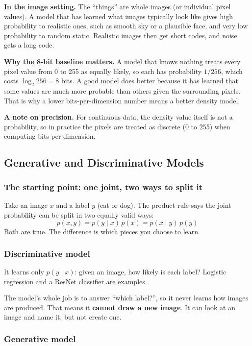 \textbf{In the image setting.} The ``things'' are whole images (or individual pixel values). A model that has learned what images typically look like gives high probability to realistic ones, such as smooth sky or a plausible face, and very low probability to random static. Realistic images then get short codes, and noise gets a long code.

\textbf{Why the 8-bit baseline matters.} A model that knows nothing treats every pixel value from 0 to 255 as equally likely, so each has probability $1/256$, which costs $\log_2 256 = 8$ bits. A good model does better because it has learned that some values are much more probable than others given the surrounding pixels. That is why a lower bits-per-dimension number means a better density model.

\textbf{A note on precision.} For continuous data, the density value itself is not a probability, so in practice the pixels are treated as discrete (0 to 255) when computing bits per dimension.

\subsection*{Generative and Discriminative Models}

\subsubsection*{The starting point: one joint, two ways to split it}

Take an image $x$ and a label $y$ (cat or dog). The product rule says the joint probability can be split in two equally valid ways:
\[
p(x, y) = p(y \mid x)\, p(x) = p(x \mid y)\, p(y)
\]
Both are true. The difference is which pieces you choose to learn.

\subsubsection*{Discriminative model}

It learns only $p(y \mid x)$: given an image, how likely is each label? Logistic regression and a ResNet classifier are examples.

The model's whole job is to answer ``which label?'', so it never learns how images are produced. That means it \textbf{cannot draw a new image}. It can look at an image and name it, but not create one.

\subsubsection*{Generative model}

